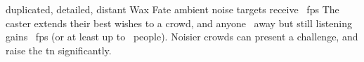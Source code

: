  {duplicated, detailed, distant}%
  {Wax}%
  {Fate}%
  {ambient noise}%
  {targets receive \showDam~\glspl{fp}}%
  {
    The caster extends their best wishes to a crowd, and anyone \spellRange\ away but still listening gains \showDam~\glspl{fp} (or at least up to \spellArea\ people).
    Noisier crowds can present a challenge, and raise the \gls{tn} significantly.
  }

